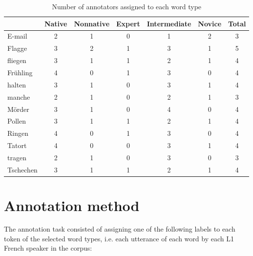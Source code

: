 	\begin{table}[htb]
		\centering
		\caption{Number of annotators assigned to each word type}
		\begin{tabular}{lcccccc}
		\toprule
		&		Native %
		& 	Nonnative %
		& Expert
		& Intermediate
		& Novice
		& Total %
		\\
		\midrule
		E-mail			& 2 	& 1 	&	0	&	1	&	2	& 3 \\
		Flagge			& 3	& 2	&	1	&	3	&	1	& 5 \\
		fliegen			& 3	& 1	&	1	&	2	&	1	& 4 \\
		Frühling		& 4	& 0	&	1	&	3	&	0	& 4 \\
		halten			& 3	& 1	&	0	&	3	&	1	& 4 \\
		manche		& 2	& 1	&	0	&	2	&	1	& 3 \\
		Mörder 		& 3	& 1	&	0	&	4	&	0	& 4 \\
		Pollen			& 3	& 1	&	1	&	2	&	1	& 4 \\
		Ringen			& 4	& 0	&	1	&	3	&	0	& 4 \\
		Tatort			& 4	& 0	&	0	&	3	&	1	& 4 \\
		tragen			& 2	& 1	&	0	&	3	&	0	& 3 \\
		Tschechen 	& 3	& 1	&	1	&	2	&	1	& 4 \\
		\bottomrule
		\end{tabular}
		\label{tab:annotatorsbyword}
	\end{table}
	
	
	
	\section{Annotation method}
	\label{sec:lexstress:method}

	The annotation task consisted of assigning one of the following labels to 
	each token of the selected word types, i.e. each utterance of each word by each L1 French speaker in the corpus:
	
